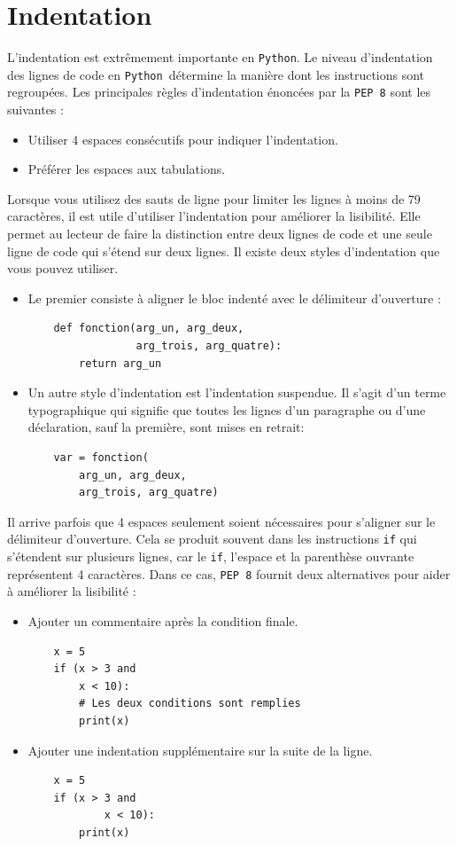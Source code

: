 \documentclass[a4paper,12pt]{book}
\begin{document}
\section{Indentation}
L'indentation est extrêmement importante en \texttt{Python}. Le niveau d'indentation des lignes de code en \texttt{Python }détermine la manière dont les instructions sont regroupées. Les principales règles d'indentation énoncées par la \texttt{PEP 8} sont les suivantes :
\begin{itemize}
	\item Utiliser 4 espaces consécutifs pour indiquer l'indentation.
	\item Préférer les espaces aux tabulations.
\end{itemize}
\medskip

Lorsque vous utilisez des sauts de ligne pour limiter les lignes à moins de 79 caractères, il est utile d'utiliser l'indentation pour améliorer la lisibilité. Elle permet au lecteur de faire la distinction entre deux lignes de code et une seule ligne de code qui s'étend sur deux lignes. Il existe deux styles d'indentation que vous pouvez utiliser.
\begin{itemize}
    \item Le premier consiste à aligner le bloc indenté avec le délimiteur d'ouverture :
    \begin{lstlisting}
    def fonction(arg_un, arg_deux,
                 arg_trois, arg_quatre):
        return arg_un
	\end{lstlisting}
	\item Un autre style d'indentation est l'indentation suspendue. Il s'agit d'un terme typographique qui signifie que toutes les lignes d'un paragraphe ou d'une déclaration, sauf la première, sont mises en retrait:
	\begin{lstlisting}
	var = fonction(
        arg_un, arg_deux,
        arg_trois, arg_quatre)
	\end{lstlisting}
\end{itemize}
\medskip

Il arrive parfois que 4 espaces seulement soient nécessaires pour s'aligner sur le délimiteur d'ouverture. Cela se produit souvent dans les instructions \texttt{if} qui s'étendent sur plusieurs lignes, car le \texttt{if}, l'espace et la parenthèse ouvrante représentent 4 caractères. Dans ce cas, \texttt{PEP 8} fournit deux alternatives pour aider à améliorer la lisibilité :
\begin{itemize}
	\item Ajouter un commentaire après la condition finale.
	\begin{lstlisting}
	x = 5
    if (x > 3 and
        x < 10):
        # Les deux conditions sont remplies
        print(x)
	\end{lstlisting}
	\item Ajouter une indentation supplémentaire sur la suite de la ligne.
	\begin{lstlisting}
	x = 5
    if (x > 3 and
            x < 10):
        print(x)
	\end{lstlisting}
\end{itemize}
\medskip
\end{document}
